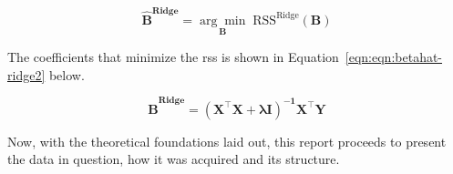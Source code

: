 \begin{equation}
	\label{eqn:betahat-ridge}
	\mathbf{\hat{B}^\text{Ridge}} = \underset{\mathbf{B}}{\arg\min} 	\; \text{RSS}^{\text{Ridge}}(\mathbf{B})
\end{equation}	

The coefficients that minimize the \acrshort{rss} is shown in Equation~\ref{eqn:eqn:betahat-ridge2} below.

\begin{equation}
	\label{eqn:eqn:betahat-ridge2}
	\mathbf{\hat{B}^\text{Ridge}} = \mathbf{(X^\intercal X + \boldsymbol{\lambda}  I )^{-1} X^\intercal Y}
\end{equation}


Now, with the theoretical foundations laid out, this report proceeds to present the data in question, how it was acquired and its structure.


